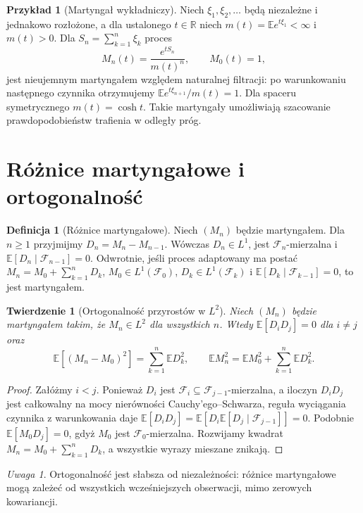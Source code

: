 \documentclass[11pt,a4paper,oneside]{report}
\numberwithin{equation}{chapter}
\theoremstyle{plain}
\newtheorem{twierdzenie}{Twierdzenie}[chapter]
\theoremstyle{definition}
\newtheorem{definicja}{Definicja}[chapter]
\newtheorem{przyklad}{Przykład}[chapter]
\theoremstyle{remark}
\newtheorem{uwaga}{Uwaga}[chapter]
\newcommand{\R}{\mathbb{R}}
\newcommand{\E}{\mathbb{E}}
\begin{document}
\begin{przyklad}[Martyngał wykładniczy]
Niech $\xi_1,\xi_2,\ldots$ będą niezależne i jednakowo
rozłożone, a dla ustalonego $t\in\R$
niech $m(t)=\E e^{t\xi_1}<\infty$ i $m(t)>0$.
Dla $S_n=\sum_{k=1}^n\xi_k$ proces
\[
M_n(t)=\frac{e^{tS_n}}{m(t)^n},\qquad M_0(t)=1,
\]
jest nieujemnym martyngałem względem naturalnej
filtracji: po warunkowaniu następnego czynnika
otrzymujemy $\E e^{t\xi_{n+1}}/m(t)=1$.
Dla spaceru symetrycznego $m(t)=\cosh t$.
Takie martyngały umożliwiają szacowanie
prawdopodobieństw trafienia w odległy próg.
\end{przyklad}

\section{Różnice martyngałowe i ortogonalność}

\begin{definicja}[Różnice martyngałowe]
Niech $(M_n)$ będzie martyngałem. Dla $n\geq1$
przyjmijmy $D_n=M_n-M_{n-1}$.
Wówczas $D_n\in L^1$, jest $\mathcal F_n$-mierzalna
i $\E[D_n\mid\mathcal F_{n-1}]=0$.
Odwrotnie, jeśli proces adaptowany ma postać
$M_n=M_0+\sum_{k=1}^nD_k$,
$M_0\in L^1(\mathcal F_0)$,
$D_k\in L^1(\mathcal F_k)$ i
$\E[D_k\mid\mathcal F_{k-1}]=0$, to jest martyngałem.
\end{definicja}

\begin{twierdzenie}[Ortogonalność przyrostów w $L^2$]
Niech $(M_n)$ będzie martyngałem takim, że
$M_n\in L^2$ dla wszystkich $n$. Wtedy
$\E[D_iD_j]=0$ dla $i\ne j$ oraz
\[
\E[(M_n-M_0)^2]=\sum_{k=1}^n\E D_k^2,
\qquad
\E M_n^2=\E M_0^2+\sum_{k=1}^n\E D_k^2.
\]
\end{twierdzenie}
\begin{proof}
Załóżmy $i<j$. Ponieważ $D_i$ jest
$\mathcal F_i\subseteq\mathcal F_{j-1}$-mierzalna,
a iloczyn $D_iD_j$ jest całkowalny na mocy
nierówności Cauchy'ego--Schwarza, reguła
wyciągania czynnika z warunkowania daje
$\E[D_iD_j]=\E[D_i\E[D_j\mid\mathcal F_{j-1}]]=0$.
Podobnie
$\E[M_0D_j]=0$, gdyż $M_0$ jest
$\mathcal F_0$-mierzalna. Rozwijamy kwadrat
$M_n=M_0+\sum_{k=1}^nD_k$, a wszystkie
wyrazy mieszane znikają.
\end{proof}

\begin{uwaga}
Ortogonalność jest słabsza od niezależności:
różnice martyngałowe mogą zależeć od wszystkich
wcześniejszych obserwacji, mimo zerowych kowariancji.
\end{uwaga}
\end{document}
